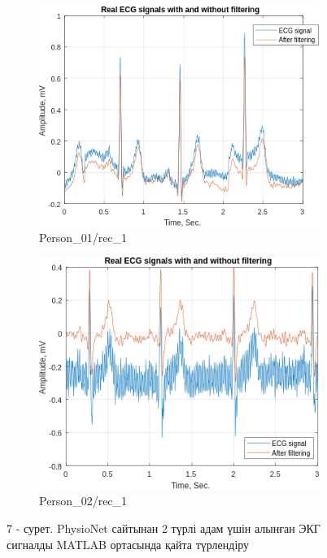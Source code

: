 \begin{figure}[H]
    \centering
    \begin{subfigure}{0.50\textwidth}
        \centering
        \includegraphics[width=\linewidth]{media/ict/image46}
        \caption*{Person\_01/rec\_1}
    \end{subfigure}
    \hfill
    \begin{subfigure}{0.475\textwidth}
        \centering
        \includegraphics[width=\linewidth]{media/ict/image47}
        \caption*{Person\_02/rec\_1}
    \end{subfigure}
    \caption*{7 - сурет. PhysioNet сайтынан 2 түрлі адам үшін алынған ЭКГ сигналды MATLAB ортасында қайта түрлендіру}
\end{figure}

